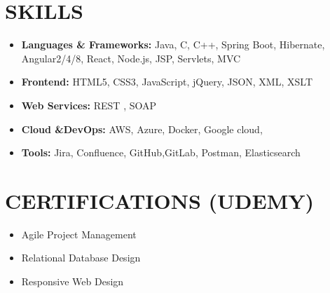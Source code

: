 \documentclass[letterpaper,11pt]{article}
\newcommand{\resumeItem}[1]{\item\small{{#1 \vspace{-3pt}}}}
\newcommand{\resumeSubHeadingListStart}{\begin{itemize}[leftmargin=0.15in, label={}]}
\newcommand{\resumeSubHeadingListEnd}{\end{itemize}}
\newcommand{\resumeItemListStart}{\begin{itemize}}
\newcommand{\resumeItemListEnd}{\end{itemize}\vspace{-5pt}}
\begin{document}
\section{{\fontsize{9pt}{20pt}\selectfont \textbf{SKILLS}}}\resumeSubHeadingListStart
\resumeItem{\textbf{Languages \& Frameworks:} Java, C, C++, Spring Boot, Hibernate, Angular2/4/8, React, Node.js, JSP, Servlets, MVC}\vspace{-7pt}
\resumeItem{\textbf{Frontend:} HTML5, CSS3, JavaScript, jQuery, JSON, XML, XSLT}\vspace{-7pt}
\resumeItem{\textbf{Web Services:} REST , SOAP}\vspace{-7pt}
\resumeItem{\textbf{Cloud \&DevOps:} AWS, Azure, Docker, Google cloud,}\vspace{-7pt}
\resumeItem{\textbf{Tools:} Jira, Confluence, GitHub,GitLab, Postman, Elasticsearch}
\resumeSubHeadingListEnd\vspace{-10pt}
\section{{\fontsize{9pt}{20pt}\selectfont \textbf{CERTIFICATIONS (UDEMY)}}}
\resumeItemListStart
\resumeItem{Agile Project Management}
\vspace{-8pt}
\resumeItem{Relational Database Design}
\vspace{-8pt}
\resumeItem{Responsive Web Design}
\vspace{-8pt}
\resumeItemListEnd
\vspace{-8pt}
\end{document}
